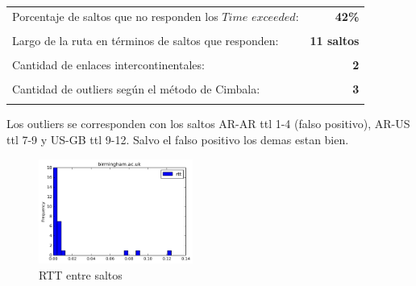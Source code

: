 \begin{center}
\begin{tabular}{p{6.5cm}r}
Porcentaje de saltos que no responden los $Time$ $exceeded$: & \textbf{42\%} \\ \\ 
Largo de la ruta en términos de saltos que responden: &\textbf{11 saltos} \\ \\
Cantidad de enlaces intercontinentales: & \textbf{2} \\ \\
Cantidad de outliers según el método de Cimbala: & \textbf{3} \\ \\
\end{tabular}
\end{center}

Los outliers se corresponden con los saltos AR-AR ttl 1-4 (falso positivo), AR-US ttl 7-9 y US-GB ttl 9-12. Salvo el falso positivo los demas estan bien.

\begin{figure}[H]
  \centering
    \includegraphics[width=0.45\textwidth]{histogramas_rtt/birmingham-ac-uk.png}
  \caption{RTT entre saltos}
  \label{entropia-s}
\end{figure}

\begin{center}

\end{center}

